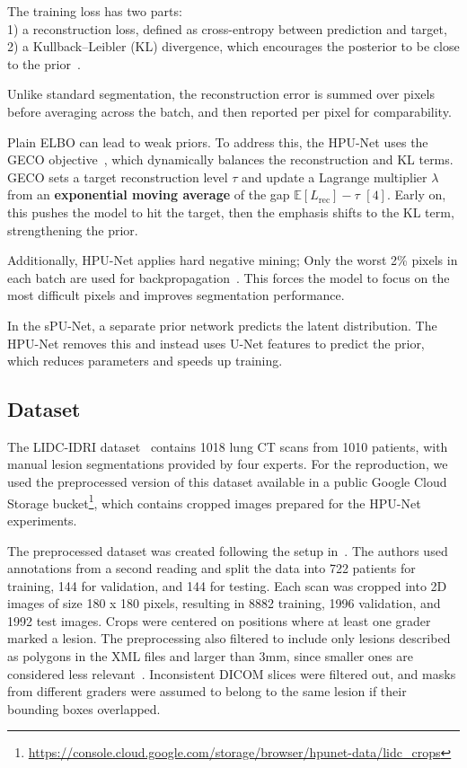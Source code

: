 \documentclass{article}
\begin{document}
The training loss has two parts: \\
1) a reconstruction loss, defined as cross-entropy between prediction and target,  \\
2) a Kullback–Leibler (KL) divergence, which encourages the posterior to be close to the prior~\cite{Kohl2019}.  

Unlike standard segmentation, the reconstruction error is summed over pixels before averaging across the batch, and then reported per pixel for comparability. 

Plain ELBO can lead to weak priors. To address this, the HPU-Net uses the GECO objective~\cite{Rezende2018}, which dynamically balances the reconstruction and KL terms. GECO sets a target reconstruction level \(\tau\) and update a Lagrange multiplier \(\lambda\) from an \textbf{exponential moving average} of the gap \(\mathbb{E}[L_{\text{rec}}]-\tau\) \([4]\).
Early on, this pushes the model to hit the target, then the emphasis shifts to the KL term, strengthening the prior.

Additionally, HPU-Net applies hard negative mining; Only the worst 2\% pixels
in each batch are used for backpropagation~\cite{Shrivastava2016}. This forces the model 
to focus on the most difficult pixels and improves segmentation performance.

In the sPU-Net, a separate prior network predicts the latent distribution. 
The HPU-Net removes this and instead uses U-Net features to predict the prior, which reduces parameters and speeds up training.

\subsection{Dataset}
The LIDC-IDRI dataset~\cite{Armato2011,Clark2013} contains 1018 lung CT scans from 1010 patients, with manual lesion segmentations provided by four experts. For the reproduction, we used the preprocessed version of this dataset available in a public Google Cloud Storage bucket\footnote{\url{https://console.cloud.google.com/storage/browser/hpunet-data/lidc_crops}}, which contains cropped images prepared for the HPU-Net experiments.

The preprocessed dataset was created following the setup in~\cite{Kohl2018}. The authors used annotations from a second reading and split the data into 722 patients for training, 144 for validation, and 144 for testing. Each scan was cropped into 2D images of size 180 x 180 pixels, resulting in 8882 training, 1996 validation, and 1992 test images. Crops were centered on positions where at least one grader marked a lesion. The preprocessing also filtered to include only lesions described as polygons in the XML files and larger than 3mm, since smaller ones are considered less relevant~\cite{Armato2011}. Inconsistent DICOM slices were filtered out, and masks from different graders were assumed to belong to the same lesion if their bounding boxes overlapped.
\end{document}
